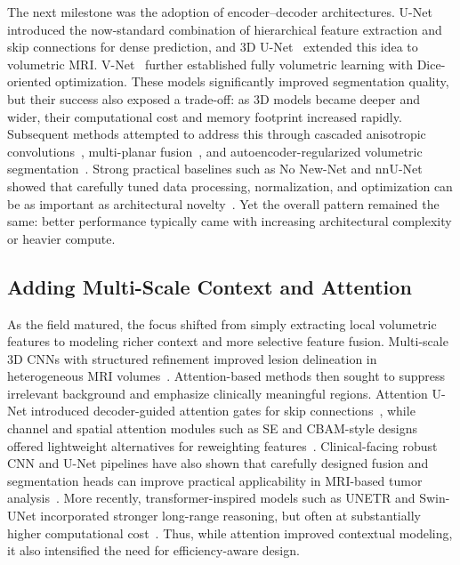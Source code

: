 \documentclass[conference]{IEEEtran}
\begin{document}
The next milestone was the adoption of encoder--decoder architectures. U-Net~\cite{ronneberger2015unet} introduced the now-standard combination of hierarchical feature extraction and skip connections for dense prediction, and 3D U-Net~\cite{cicek20163dunet} extended this idea to volumetric MRI. V-Net~\cite{milletari2016vnet} further established fully volumetric learning with Dice-oriented optimization. These models significantly improved segmentation quality, but their success also exposed a trade-off: as 3D models became deeper and wider, their computational cost and memory footprint increased rapidly. Subsequent methods attempted to address this through cascaded anisotropic convolutions~\cite{wang2019cascaded}, multi-planar fusion~\cite{andermatt2018multiplanar}, and autoencoder-regularized volumetric segmentation~\cite{myronenko2019autoencoder}. Strong practical baselines such as No New-Net and nnU-Net showed that carefully tuned data processing, normalization, and optimization can be as important as architectural novelty~\cite{isensee2018nonewnet,isensee2021nnu}. Yet the overall pattern remained the same: better performance typically came with increasing architectural complexity or heavier compute.

\subsection{Adding Multi-Scale Context and Attention}

As the field matured, the focus shifted from simply extracting local volumetric features to modeling richer context and more selective feature fusion. Multi-scale 3D CNNs with structured refinement improved lesion delineation in heterogeneous MRI volumes~\cite{kamnitsas2017multiscalecrf}. Attention-based methods then sought to suppress irrelevant background and emphasize clinically meaningful regions. Attention U-Net introduced decoder-guided attention gates for skip connections~\cite{oktay2018attentionunet}, while channel and spatial attention modules such as SE and CBAM-style designs offered lightweight alternatives for reweighting features~\cite{hu2018senet,woo2018cbam}. Clinical-facing robust CNN and U-Net pipelines have also shown that carefully designed fusion and segmentation heads can improve practical applicability in MRI-based tumor analysis~\cite{akter2024robust}. More recently, transformer-inspired models such as UNETR and Swin-UNet incorporated stronger long-range reasoning, but often at substantially higher computational cost~\cite{hatamizadeh2022unetr,cao2022swinunet}. Thus, while attention improved contextual modeling, it also intensified the need for efficiency-aware design.
\end{document}
